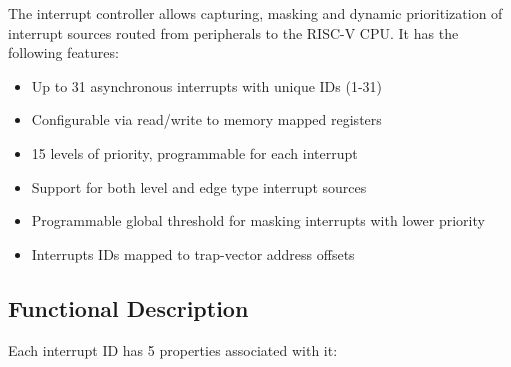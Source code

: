 \documentclass[main\_\_EN.tex]{subfiles}
\begin{document}
The interrupt controller allows capturing, masking and dynamic prioritization of interrupt sources routed from peripherals to the RISC-V CPU. It has the following features:

\begin{itemize}
    \item Up to 31 asynchronous interrupts with unique IDs (1-31)
    \item Configurable via read/write to memory mapped registers
    \item 15 levels of priority, programmable for each interrupt
    \item Support for both level and edge type interrupt sources
    \item Programmable global threshold for masking interrupts with lower priority
    \item Interrupts IDs mapped to trap-vector address offsets
\end{itemize}


\subsection{Functional Description}
\label{sec:riscvcpu-int-func-descr}

Each interrupt ID has 5 properties associated with it:
\end{document}
